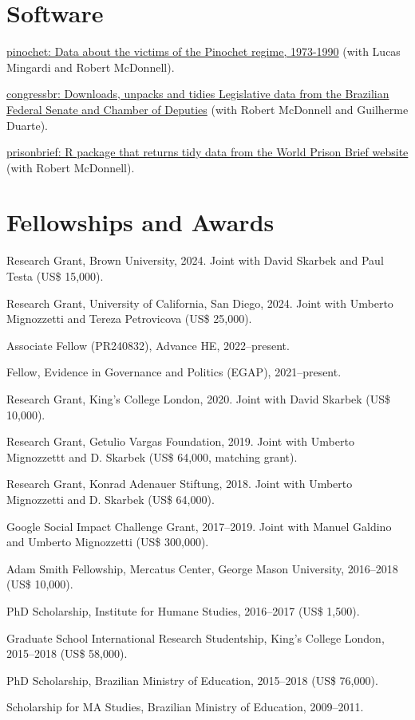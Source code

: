 \documentclass[a4paper]{article}
\renewenvironment{itemize}{
	\begin{list}{}{
			\setlength{\leftmargin}{1.5em}
		}
		}{
	\end{list}
}
\begin{document}
\section*{Software}

\begin{itemize}
  \item \href{http://danilofreire.github.io/pinochet}{pinochet: Data about the victims of the Pinochet regime, 1973-1990} (with Lucas Mingardi and Robert McDonnell).
  \item \href{https://github.com/RobertMyles/congressbr}{congressbr: Downloads, unpacks and tidies Legislative data from the Brazilian Federal Senate and Chamber of Deputies} (with Robert McDonnell and Guilherme Duarte).
  \item \href{http://danilofreire.github.io/prisonbrief}{prisonbrief: R package that returns tidy data from the World Prison Brief website} (with Robert McDonnell).
\end{itemize}

\section*{Fellowships and Awards}

\begin{itemize}
\item Research Grant, Brown University, 2024. Joint with David Skarbek and Paul Testa (US\$ 15,000).
\item Research Grant, University of California, San Diego, 2024. Joint with Umberto Mignozzetti and Tereza Petrovicova (US\$ 25,000).
\item Associate Fellow (PR240832), Advance HE, 2022--present.
\item Fellow, Evidence in Governance and Politics (EGAP), 2021--present.
\item Research Grant, King's College London, 2020. Joint with David Skarbek (US\$ 10,000).
\item Research Grant, Getulio Vargas Foundation, 2019. Joint with Umberto Mignozzettt and D. Skarbek (US\$ 64,000, matching grant).
\item Research Grant, Konrad Adenauer Stiftung, 2018. Joint with Umberto Mignozzetti and D. Skarbek (US\$ 64,000).
\item Google Social Impact Challenge Grant, 2017--2019. Joint with Manuel Galdino and Umberto Mignozzetti (US\$ 300,000).
\item Adam Smith Fellowship, Mercatus Center, George Mason University, 2016--2018 (US\$ 10,000).
\item PhD Scholarship, Institute for Humane Studies, 2016--2017 (US\$ 1,500).
\item Graduate School International Research Studentship, King's College London, 2015--2018 (US\$ 58,000).
\item PhD Scholarship, Brazilian Ministry of Education, 2015--2018 (US\$ 76,000).
\item Scholarship for MA Studies, Brazilian Ministry of Education, 2009--2011.
\end{itemize}
\end{document}
